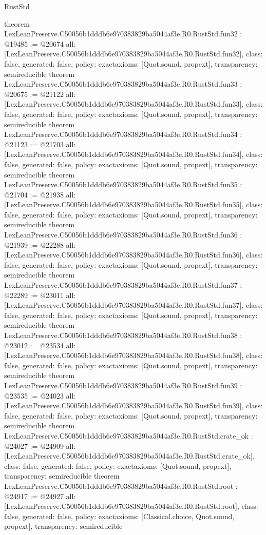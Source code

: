 \begin{lexlean}{RustStd}
\begin{coremodule}
{}
theorem LexLeanPreserve.C50056b1dddb6e970383829ba5044af3e.R0.RustStd.fun32 : @19485 := @20674 {
  all: [LexLeanPreserve.C50056b1dddb6e970383829ba5044af3e.R0.RustStd.fun32],
  class: false,
  generated: false,
  policy: exact{axioms: [Quot.sound, propext]},
  transparency: semireducible
}
theorem LexLeanPreserve.C50056b1dddb6e970383829ba5044af3e.R0.RustStd.fun33 : @20675 := @21122 {
  all: [LexLeanPreserve.C50056b1dddb6e970383829ba5044af3e.R0.RustStd.fun33],
  class: false,
  generated: false,
  policy: exact{axioms: [Quot.sound, propext]},
  transparency: semireducible
}
theorem LexLeanPreserve.C50056b1dddb6e970383829ba5044af3e.R0.RustStd.fun34 : @21123 := @21703 {
  all: [LexLeanPreserve.C50056b1dddb6e970383829ba5044af3e.R0.RustStd.fun34],
  class: false,
  generated: false,
  policy: exact{axioms: [Quot.sound, propext]},
  transparency: semireducible
}
theorem LexLeanPreserve.C50056b1dddb6e970383829ba5044af3e.R0.RustStd.fun35 : @21704 := @21938 {
  all: [LexLeanPreserve.C50056b1dddb6e970383829ba5044af3e.R0.RustStd.fun35],
  class: false,
  generated: false,
  policy: exact{axioms: [Quot.sound, propext]},
  transparency: semireducible
}
theorem LexLeanPreserve.C50056b1dddb6e970383829ba5044af3e.R0.RustStd.fun36 : @21939 := @22288 {
  all: [LexLeanPreserve.C50056b1dddb6e970383829ba5044af3e.R0.RustStd.fun36],
  class: false,
  generated: false,
  policy: exact{axioms: [Quot.sound, propext]},
  transparency: semireducible
}
theorem LexLeanPreserve.C50056b1dddb6e970383829ba5044af3e.R0.RustStd.fun37 : @22289 := @23011 {
  all: [LexLeanPreserve.C50056b1dddb6e970383829ba5044af3e.R0.RustStd.fun37],
  class: false,
  generated: false,
  policy: exact{axioms: [Quot.sound, propext]},
  transparency: semireducible
}
theorem LexLeanPreserve.C50056b1dddb6e970383829ba5044af3e.R0.RustStd.fun38 : @23012 := @23534 {
  all: [LexLeanPreserve.C50056b1dddb6e970383829ba5044af3e.R0.RustStd.fun38],
  class: false,
  generated: false,
  policy: exact{axioms: [Quot.sound, propext]},
  transparency: semireducible
}
theorem LexLeanPreserve.C50056b1dddb6e970383829ba5044af3e.R0.RustStd.fun39 : @23535 := @24023 {
  all: [LexLeanPreserve.C50056b1dddb6e970383829ba5044af3e.R0.RustStd.fun39],
  class: false,
  generated: false,
  policy: exact{axioms: [Quot.sound, propext]},
  transparency: semireducible
}
theorem LexLeanPreserve.C50056b1dddb6e970383829ba5044af3e.R0.RustStd.crate_ok : @24027 := @24909 {
  all: [LexLeanPreserve.C50056b1dddb6e970383829ba5044af3e.R0.RustStd.crate_ok],
  class: false,
  generated: false,
  policy: exact{axioms: [Quot.sound, propext]},
  transparency: semireducible
}
theorem LexLeanPreserve.C50056b1dddb6e970383829ba5044af3e.R0.RustStd.root : @24917 := @24927 {
  all: [LexLeanPreserve.C50056b1dddb6e970383829ba5044af3e.R0.RustStd.root],
  class: false,
  generated: false,
  policy: exact{axioms: [Classical.choice, Quot.sound, propext]},
  transparency: semireducible
}


\end{coremodule}
\end{lexlean}
